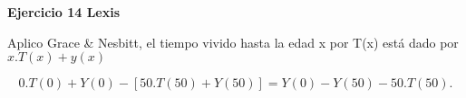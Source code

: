 
\textbf{Ejercicio 14 Lexis}

Aplico  {\color{blue} Grace & Nesbitt}, el tiempo vivido hasta la edad x por T(x) está dado por $ x.T(x) + y(x)$
 
\[
 0.T(0)+Y(0) - [50.T(50)+Y(50)] = Y(0)-Y(50) - 50.T(50)
.\] 





